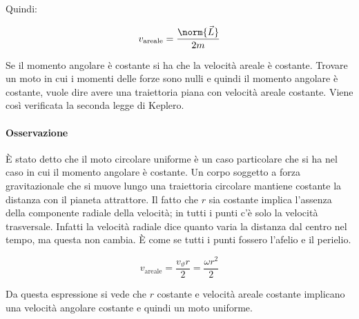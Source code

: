 Quindi:

\[
	v_\text{areale}=\frac{\norm{\vec{L}}}{2m}
\]

Se il momento angolare è costante si ha che la velocità areale è costante. Trovare un moto in cui i momenti delle forze sono nulli e quindi il momento angolare è costante, vuole dire avere una traiettoria piana con velocità areale costante. Viene così verificata la seconda legge di Keplero.

\paragraph{Osservazione} È stato detto che il moto circolare uniforme è un caso particolare che si ha nel caso in cui il momento angolare è costante. Un corpo soggetto a forza gravitazionale che si muove lungo una traiettoria circolare mantiene costante la distanza con il pianeta attrattore. Il fatto che $r$ sia costante implica l'assenza della componente radiale della velocità; in tutti i punti c'è solo la velocità trasversale. Infatti la velocità radiale dice quanto varia la distanza dal centro nel tempo, ma questa non cambia. È come se tutti i punti fossero l'afelio e il perielio.

\[
	v_\text{areale}=\frac{v_\vartheta r}{2}=\frac{\omega r^2}{2}
\]

Da questa espressione si vede che $r$ costante e velocità areale costante implicano una velocità angolare costante e quindi un moto uniforme.

